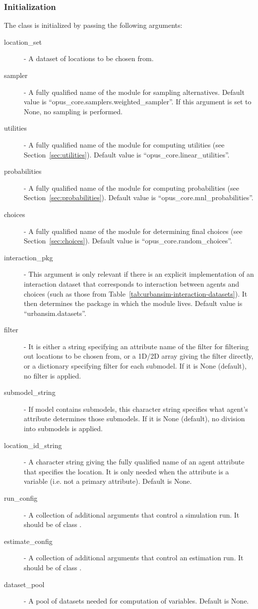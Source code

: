 \subsubsection{Initialization}
%
The class is initialized by passing the following arguments:
\begin{description}
\item[location_set] - A dataset \datasetindex of locations to be chosen from.
\item[sampler] - A fully qualified name of the module for sampling
  alternatives. Default value is ``opus_core.samplers.weighted_sampler''. If
  this argument is set to None, no sampling is performed.
\item[utilities] - A fully qualified name of the module for computing utilities
  (see Section~\ref{sec:utilities}). Default value is
  ``opus_core.linear_utilities''.
\item[probabilities] - A fully qualified name of the module for computing
  probabilities (see Section~\ref{sec:probabilities}). Default value is
  ``opus_core.mnl_probabilities''.
\item[choices] - A fully qualified name of the module for determining
  final choices (see Section~\ref{sec:choices}). Default value is
  ``opus_core.random_choices''.
\item[interaction_pkg] - This argument is only relevant if there is an
  explicit implementation of an interaction dataset that corresponds to
  interaction between agents and choices (such as those from
  Table~\ref{tab:urbansim-interaction-datasets}). It then determines the
  package in which the module lives. Default value is
  ``urbansim.datasets''. \datasetindex
\item[filter] - It is either a string specifying an attribute \attributesindex name of the
  filter for filtering out locations to be chosen from, or a 1D/2D array giving the filter directly, or a dictionary
  specifying filter for each submodel. If it is None (default), no filter is
  applied.
\item[submodel_string] - If model \modelsindex contains submodels, this character string
  specifies what agent's attribute determines those submodels. If it is None
  (default), no division into submodels is applied.
\item[location_id_string] - A character string giving the fully qualified name of an agent attribute
  that specifies the location. It is only needed when the attribute is a variable (i.e. not a primary attribute).
  Default is None.
\item[run_config] - A collection of additional arguments that control a
  simulation run. It should be of class .
\item[estimate_config] - A collection of additional arguments that control an
  estimation run. It should be of class .
\item[dataset_pool] - A pool of datasets needed for computation of variables. Default is None.
\end{description}
